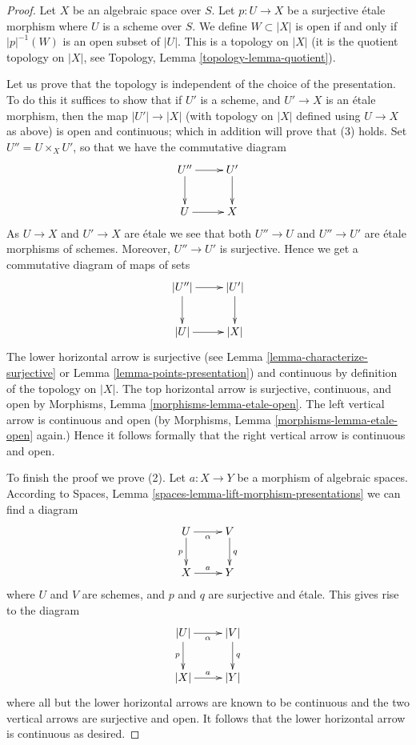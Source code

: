 \documentclass[10pt,a4paper]{amsart}
\theoremstyle{plain}
\theoremstyle{definition}
\theoremstyle{remark}
\numberwithin{equation}{subsection}
\begin{document}
\begin{proof}
Let $X$ be an algebraic space over $S$. Let $p : U \to X$ be a
surjective \'etale morphism where $U$ is a scheme over $S$.
We define $W \subset |X|$ is open if and only if $|p|^{-1}(W)$
is an open subset of $|U|$. This is a topology on $|X|$
(it is the quotient topology on $|X|$, see
Topology, Lemma \ref{topology-lemma-quotient}).

\medskip\noindent
Let us prove that the topology is independent of the choice of
the presentation. To do this it suffices to show that if $U'$ is a scheme,
and $U' \to X$ is an \'etale morphism, then the map $|U'| \to |X|$
(with topology on $|X|$ defined using $U \to X$ as above)
is open and continuous; which in addition will prove that (3) holds.
Set $U'' = U \times_X U'$, so that we have the commutative diagram
$$
\xymatrix{
U'' \ar[r] \ar[d] & U' \ar[d] \\
U \ar[r] & X
}
$$
As $U \to X$ and $U' \to X$ are \'etale we see that
both $U'' \to U$ and $U'' \to U'$ are \'etale morphisms of schemes.
Moreover, $U'' \to U'$ is surjective. Hence
we get a commutative diagram of maps of sets
$$
\xymatrix{
|U''| \ar[r] \ar[d] & |U'| \ar[d] \\
|U| \ar[r] & |X|
}
$$
The lower horizontal arrow is surjective (see
Lemma \ref{lemma-characterize-surjective}
or
Lemma \ref{lemma-points-presentation})
and continuous by definition of the topology on $|X|$.
The top horizontal arrow is surjective, continuous, and open by
Morphisms, Lemma \ref{morphisms-lemma-etale-open}.
The left vertical arrow is continuous and open (by
Morphisms, Lemma \ref{morphisms-lemma-etale-open}
again.) Hence it follows formally that the right vertical
arrow is continuous and open.

\medskip\noindent
To finish the proof we prove (2).
Let $a : X \to Y$ be a morphism of algebraic spaces. According to
Spaces, Lemma \ref{spaces-lemma-lift-morphism-presentations}
we can find a diagram
$$
\xymatrix{
U \ar[d]_p \ar[r]_\alpha & V \ar[d]^q \\
X \ar[r]^a & Y
}
$$
where $U$ and $V$ are schemes, and $p$ and $q$ are surjective and \'etale.
This gives rise to the diagram
$$
\xymatrix{
|U| \ar[d]_p \ar[r]_\alpha & |V| \ar[d]^q \\
|X| \ar[r]^a & |Y|
}
$$
where all but the lower horizontal arrows are known to be continuous and
the two vertical arrows are surjective and open. It follows that the
lower horizontal arrow is continuous as desired.
\end{proof}
\end{document}
